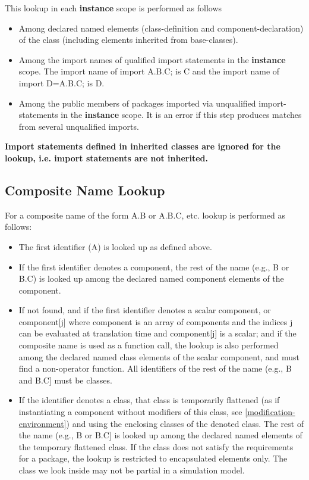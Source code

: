 \documentclass[10pt,a4paper]{report}
\def\doublelabel#1{\label{#1}\hypertarget{#1}{}}
\begin{document}
This lookup in each \textbf{instance} scope is performed as follows

\begin{itemize}
\item
  Among declared named elements (class-definition and
  component-declaration) of the class (including elements inherited from
  base-classes).
\item
  Among the import names of qualified import statements in the
  \textbf{instance} scope. The import name of import A.B.C; is C and the
  import name of import D=A.B.C; is D.
\item
  Among the public members of packages imported via unqualified
  import-statements in the \textbf{instance} scope. It is an error if
  this step produces matches from several unqualified imports.
\end{itemize}

\textbf{Import statements defined in inherited classes are ignored for
the lookup, i.e. import statements are not inherited.}

\subsection{Composite Name Lookup}\doublelabel{composite-name-lookup}

For a composite name of the form A.B or A.B.C, etc. lookup is performed
as follows:

\begin{itemize}
\item
  The first identifier (A) is looked up as defined above.
\end{itemize}

\begin{itemize}
\item
  If the first identifier denotes a component, the rest of the name
  (e.g., B or B.C) is looked up among the declared named component
  elements of the component.
\item
  If not found, and if the first identifier denotes a scalar component,
  or component[j] where component is an array of components and the
  indices j can be evaluated at translation time and component[j] is
  a scalar; and if the composite name is used as a function call, the
  lookup is also performed among the declared named class elements of
  the scalar component, and must find a non-operator function. All
  identifiers of the rest of the name (e.g., B and B.C] must be
  classes.
\item
  If the identifier denotes a class, that class is temporarily flattened
  (as if instantiating a component without modifiers of this class, see
  \ref{modification-environment}) and using the enclosing classes of the denoted class.
  The rest of the name (e.g., B or B.C{]} is looked up among the
  declared named elements of the temporary flattened class. If the class
  does not satisfy the requirements for a package, the lookup is
  restricted to encapsulated elements only. The class we look inside may
  not be partial in a simulation model.
\end{itemize}
\end{document}

